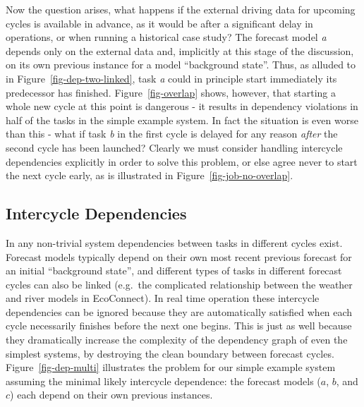 \documentclass[11pt,a4paper]{article}
\begin{document}
Now the question arises, what happens if the external driving data for
upcoming cycles is available in advance, as it would be after a
significant delay in operations, or when running a historical case
study?  The forecast model {\em a} depends only on the external data
and, implicitly at this stage of the discussion, on its own previous
instance for a model ``background state''. Thus, as alluded to in
Figure~\ref{fig-dep-two-linked}, task {\em a} could in principle start
immediately its predecessor has finished.  Figure~\ref{fig-overlap}
shows, however, that starting a whole new cycle at this point is
dangerous - it results in dependency violations in half of the tasks in
the simple example system. In fact the situation is even worse than this
- what if task {\em b} in the first cycle is delayed for any reason {\em
after} the second cycle has been launched? Clearly we must consider
handling intercycle dependencies explicitly in order to solve this
problem, or else agree never to start the next cycle early, as
is illustrated in Figure~\ref{fig-job-no-overlap}.


\subsection{Intercycle Dependencies} 
\label{IntercycleDependencies}

In any non-trivial system dependencies between tasks in different cycles
exist. Forecast models typically depend on their own most recent
previous forecast for an initial ``background state'', and different
types of tasks in different forecast cycles can also be linked (e.g.\
the complicated relationship between the weather and river models in
EcoConnect). In real time operation these intercycle dependencies
can be ignored because they are automatically satisfied when each cycle
necessarily finishes before the next one begins. This is just as well
because they dramatically increase the complexity of the dependency
graph of even the simplest systems, by destroying the clean boundary
between forecast cycles. Figure~\ref{fig-dep-multi} illustrates the
problem for our simple example system assuming the minimal likely
intercycle dependence: the forecast models ($a$, $b$, and $c$) each
depend on their own previous instances.
\end{document}
